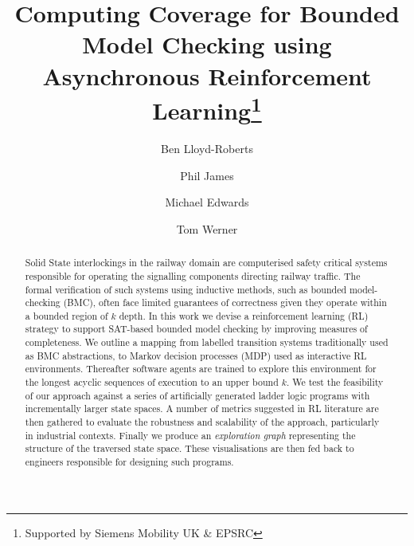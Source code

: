 \documentclass[runningheads]{llncs}
\begin{document}
%
\title{Computing Coverage for Bounded Model Checking using Asynchronous Reinforcement Learning\thanks{Supported by Siemens Mobility UK \& EPSRC}}
%
%
\author{Ben Lloyd-Roberts \and
Phil James \and
Michael Edwards \and 
Tom Werner}
%
%


%
\maketitle              %
%
\begin{abstract}
Solid State interlockings in the railway domain are computerised safety critical systems responsible for operating the signalling components directing railway traffic. The formal verification of such systems using inductive methods, such as bounded model-checking (BMC), often face limited guarantees of correctness given they operate within a bounded region of $k$ depth. In this work we devise a reinforcement learning (RL) strategy to support SAT-based bounded model checking by improving measures of completeness. We outline a mapping from labelled transition systems traditionally used as BMC abstractions, to Markov decision processes (MDP) used as interactive RL environments. Thereafter software agents are trained to explore this environment for the longest acyclic sequences of execution to an upper bound $k$. We test the feasibility of our approach against a series of artificially generated ladder logic programs with incrementally larger state spaces. A number of metrics suggested in RL literature are then gathered to evaluate the robustness and scalability of the approach, particularly in industrial contexts. Finally we produce an \textit{exploration graph} representing the structure of the traversed state space. These visualisations are then fed back to engineers responsible for designing such programs.

\end{abstract}
\end{document}
